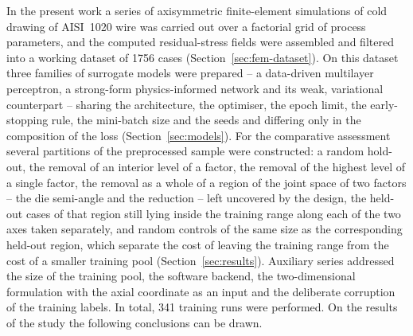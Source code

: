 \documentclass[subscriptcorrection,upint,varvw,barcolor=Goldenrod3,mathalfa=cal=euler,balance,hyphenate,french,pdf-a]{asmejour} %
\begin{document}
In the present work a series of axisymmetric finite-element simulations of cold drawing of AISI~1020 wire was carried out over a factorial grid of process parameters, and the computed residual-stress fields were assembled and filtered into a working dataset of 1756 cases (Section~\ref{sec:fem-dataset}). On this dataset three families of surrogate models were prepared -- a data-driven multilayer perceptron, a strong-form physics-informed network and its weak, variational counterpart -- sharing the architecture, the optimiser, the epoch limit, the early-stopping rule, the mini-batch size and the seeds and differing only in the composition of the loss (Section~\ref{sec:models}). For the comparative assessment several partitions of the preprocessed sample were constructed: a random hold-out, the removal of an interior level of a factor, the removal of the highest level of a single factor, the removal as a whole of a region of the joint space of two factors -- the die semi-angle and the reduction -- left uncovered by the design, the held-out cases of that region still lying inside the training range along each of the two axes taken separately, and random controls of the same size as the corresponding held-out region, which separate the cost of leaving the training range from the cost of a smaller training pool (Section~\ref{sec:results}). Auxiliary series addressed the size of the training pool, the software backend, the two-dimensional formulation with the axial coordinate as an input and the deliberate corruption of the training labels. In total, 341 training runs were performed. On the results of the study the following conclusions can be drawn.
\end{document}
